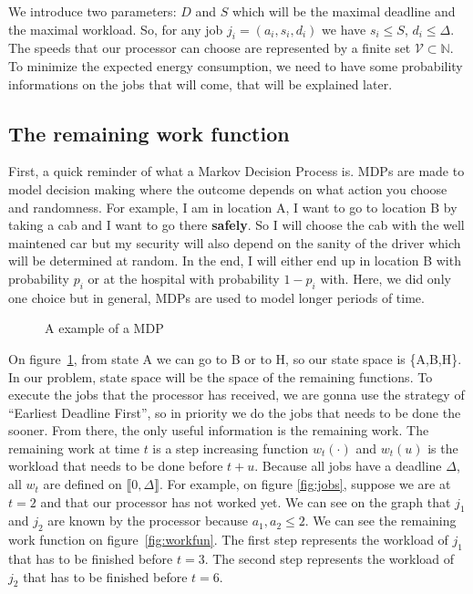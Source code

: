 \documentclass[
10pt, %
a4paper, %
oneside, %
headinclude,footinclude, %
BCOR5mm, %
]{scrartcl}
\newcommand{\N}{\mathbb{N}}
\newcommand{\V}{\mathcal{V}}
\begin{document}
We introduce two parameters: $D$ and $S$ which will be the maximal
deadline and the maximal workload. So, for any job
$j_i=(a_i,s_i,d_i)$ we have $s_i\leq S$, $d_i\leq \Delta$.
The speeds that our processor can choose are represented by a finite
set $\V\subset\N$. To minimize the expected energy consumption, we
need to have some probability informations on the jobs that will
come, that will be explained later.

\subsection{The remaining work function}
First, a quick reminder of what a Markov Decision Process is. MDPs are
made to model decision making where the outcome depends on what action
you choose and randomness. For example, I am in location A, I want to
go to location B by taking a cab and I want to go there
\textbf{safely}. So I will choose the cab with the well maintened car
but my security will also depend on the sanity of the driver which
will be determined at random. In the end, I will either end up in
location B with probability $p_i$ or at the hospital with probability
$1-p_i$ with. Here, we did only one choice but in general, MDPs are
used to model longer periods of time.\\

\begin{figure}
  \centering
  \caption{A example of a MDP}
  \label{fig:mdp}
\end{figure}

On figure~\ref{fig:mdp}, from state A we can go to B or to H, so our state
space is \{A,B,H\}. In our problem, state space will be the space of
the remaining functions. To execute the jobs that the processor has
received, we are gonna use the strategy of ``Earliest Deadline
First'', so in priority we do the jobs that needs to be done the
sooner. From there, the only useful information is the remaining
work. The remaining work at time $t$ is a step increasing function
$w_t(\cdot)$ and $w_t(u)$ is the workload that needs to be done before
$t+u$. Because all jobs have a deadline $\Delta$, all $w_t$ are
defined on $\llbracket 0,\Delta\rrbracket$. For example, on figure
\ref{fig:jobs}, suppose we are at $t=2$ and that our processor has not
worked yet. We can see on the graph that $j_1$ and $j_2$ are known by
the processor because $a_1,a_2\leq 2$. We can see the remaining work
function on figure~\ref{fig:workfun}. The first step represents the
workload of $j_1$ that has to be finished before $t=3$. The second
step represents the workload of $j_2$ that has to be finished before
$t=6$. 
\end{document}
